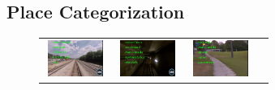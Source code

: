 \documentclass[letterpaper, 10 pt, conference]{ieeeconf}  %
\begin{document}
\subsection{Place Categorization}

\newcommand{\widthA}{2cm}
\newcommand{\heightA}{1.2cm}
\begin{figure}
	\centering
	\begin{tabular}{p{1.7cm}p{1.7cm}p{1.7cm}p{1.7cm}}
		\includegraphics[width=\widthA,height=\heightA]{4-railroad} &
		\includegraphics[width=\widthA,height=\heightA]{6-tunnel} &
		\includegraphics[width=\widthA,height=\heightA]{1-outdoor}&

\end{tabular}
\end{figure}
\end{document}
